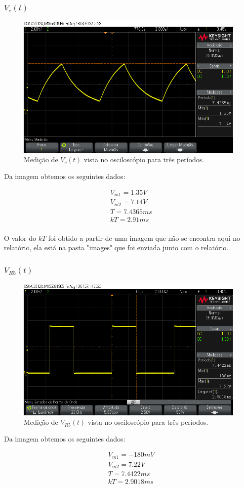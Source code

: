 \subsubsection{$V_c (t)$}

\begin{figure}[H]
    \centering
    \includegraphics[width=0.7\columnwidth]{images/ex2_vc.png}
    \caption{Medição de $V_c(t)$ vista no osciloscópio para três períodos.}
\end{figure}

Da imagem obtemos os seguintes dados:

\begin{equation}
    \begin{aligned}
         & V_{m1} = 1.35V \\
         & V_{m2} = 7.14V \\
         & T = 7.4365ms   \\
         & kT =  2.91ms   \\
    \end{aligned}
\end{equation}

O valor do $kT$ foi obtido a partir de uma imagem que não se encontra aqui no relatório, ela está na pasta "images" que foi enviada junto com o relatório.

\subsubsection{$V_{R5} (t)$}

\begin{figure}[H]
    \centering
    \includegraphics[width=0.7\columnwidth]{images/ex2_r5.png}
    \caption{Medição de $V_{R5}(t)$ vista no osciloscópio para três períodos.}
\end{figure}

Da imagem obtemos os seguintes dados:

\begin{equation}
    \begin{aligned}
         & V_{m1} = -180mV \\
         & V_{m2} = 7.22V  \\
         & T = 7.4422ms    \\
         & kT =  2.9018ms  \\
    \end{aligned}
\end{equation}